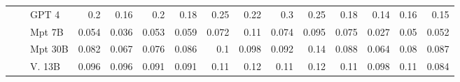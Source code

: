 \begin{table}[!htbp]
{\begin{tabular}{l|l|l|rrrr|rrrr|rrrr}
 &  & GPT 4 & {\cellcolor[HTML]{026F2E}} \color[HTML]{F1F1F1} 0.2 & {\cellcolor[HTML]{2F974E}} \color[HTML]{F1F1F1} 0.16 & {\cellcolor[HTML]{006C2C}} \color[HTML]{F1F1F1} 0.2 & {\cellcolor[HTML]{16803C}} \color[HTML]{F1F1F1} 0.18 & {\cellcolor[HTML]{DB4B03}} \color[HTML]{F1F1F1} 0.25 & {\cellcolor[HTML]{EF6612}} \color[HTML]{F1F1F1} 0.22 & {\cellcolor[HTML]{963003}} \color[HTML]{F1F1F1} 0.3 & {\cellcolor[HTML]{D34601}} \color[HTML]{F1F1F1} 0.25 & {\cellcolor[HTML]{4C1888}} \color[HTML]{F1F1F1} 0.18 & {\cellcolor[HTML]{705CA9}} \color[HTML]{F1F1F1} 0.14 & {\cellcolor[HTML]{5B3495}} \color[HTML]{F1F1F1} 0.16 & {\cellcolor[HTML]{66499F}} \color[HTML]{F1F1F1} 0.15 \\
 &  & Mpt 7B & {\cellcolor[HTML]{DEF2D9}} \color[HTML]{000000} 0.054 & {\cellcolor[HTML]{EEF8EA}} \color[HTML]{000000} 0.036 & {\cellcolor[HTML]{E0F3DB}} \color[HTML]{000000} 0.053 & {\cellcolor[HTML]{D8F0D2}} \color[HTML]{000000} 0.059 & {\cellcolor[HTML]{FEE6CE}} \color[HTML]{000000} 0.072 & {\cellcolor[HTML]{FDD1A3}} \color[HTML]{000000} 0.11 & {\cellcolor[HTML]{FEE5CB}} \color[HTML]{000000} 0.074 & {\cellcolor[HTML]{FDD8B2}} \color[HTML]{000000} 0.095 & {\cellcolor[HTML]{CDCDE4}} \color[HTML]{000000} 0.075 & {\cellcolor[HTML]{FAF8FB}} \color[HTML]{000000} 0.027 & {\cellcolor[HTML]{EAE8F2}} \color[HTML]{000000} 0.05 & {\cellcolor[HTML]{E8E6F2}} \color[HTML]{000000} 0.052 \\
 &  & Mpt 30B & {\cellcolor[HTML]{BAE3B3}} \color[HTML]{000000} 0.082 & {\cellcolor[HTML]{CFECC9}} \color[HTML]{000000} 0.067 & {\cellcolor[HTML]{C3E7BC}} \color[HTML]{000000} 0.076 & {\cellcolor[HTML]{B4E1AD}} \color[HTML]{000000} 0.086 & {\cellcolor[HTML]{FDD5AB}} \color[HTML]{000000} 0.1 & {\cellcolor[HTML]{FDD7AF}} \color[HTML]{000000} 0.098 & {\cellcolor[HTML]{FDD9B5}} \color[HTML]{000000} 0.092 & {\cellcolor[HTML]{FDB576}} \color[HTML]{000000} 0.14 & {\cellcolor[HTML]{BABADB}} \color[HTML]{000000} 0.088 & {\cellcolor[HTML]{DCDCEC}} \color[HTML]{000000} 0.064 & {\cellcolor[HTML]{C6C7E1}} \color[HTML]{000000} 0.08 & {\cellcolor[HTML]{BCBDDC}} \color[HTML]{000000} 0.087 \\
 &  & V. 13B  & {\cellcolor[HTML]{A4DA9E}} \color[HTML]{000000} 0.096 & {\cellcolor[HTML]{A4DA9E}} \color[HTML]{000000} 0.096 & {\cellcolor[HTML]{ABDDA5}} \color[HTML]{000000} 0.091 & {\cellcolor[HTML]{ACDEA6}} \color[HTML]{000000} 0.091 & {\cellcolor[HTML]{FDD1A4}} \color[HTML]{000000} 0.11 & {\cellcolor[HTML]{FDC794}} \color[HTML]{000000} 0.12 & {\cellcolor[HTML]{FDCB9B}} \color[HTML]{000000} 0.11 & {\cellcolor[HTML]{FDC38D}} \color[HTML]{000000} 0.12 & {\cellcolor[HTML]{A19ECA}} \color[HTML]{F1F1F1} 0.11 & {\cellcolor[HTML]{ACAAD1}} \color[HTML]{000000} 0.098 & {\cellcolor[HTML]{9692C4}} \color[HTML]{F1F1F1} 0.11 & {\cellcolor[HTML]{BFC0DE}} \color[HTML]{000000} 0.084 \\

\end{tabular}}
\end{table}
